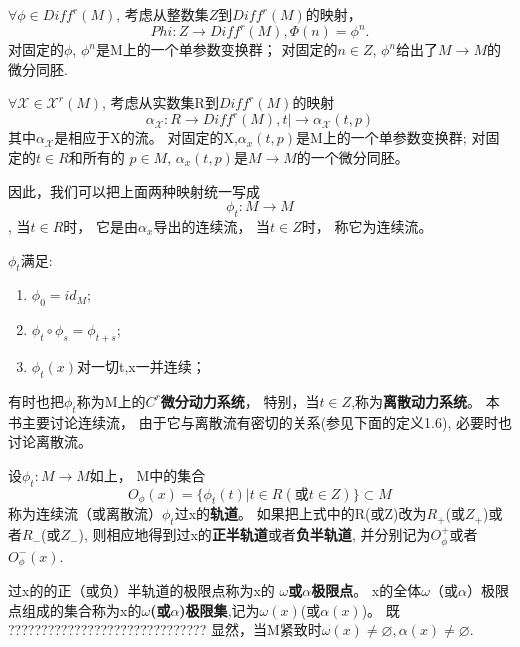 \(\forall \phi \in Diff^r(M)\),
考虑从整数集\(Z\)到\(Diff^r(M)\)的映射，
\begin{equation}
  Phi:Z \to Diff^r(M),\Phi(n)=\phi^n.
\end{equation}
对固定的\(\phi\),
\(\phi^n\)是M上的一个单参数变换群；
对固定的\(n\in Z\),
\(\phi^n\)给出了\(M \to M\)的微分同胚.


\(\forall \mathcal X\in \mathcal{X}^r(M)\),
考虑从实数集R到\(Diff^r(M)\)的映射
\begin{equation}
\alpha_{\mathcal{X}}:R\to Diff^r(M),t|\to \alpha_{\mathcal{X}}(t,p)
\end{equation}
其中\(\alpha_{\mathcal{X}}\)是相应于X的流。
对固定的X,\(\alpha_x(t,p)\)是M上的一个单参数变换群;
对固定的\(t\in R\)和所有的
\(p \in M\),
\(\alpha_x(t,p)\)是\(M \to M\)的一个微分同胚。


因此，我们可以把上面两种映射统一写成
\[\phi_t:M\to M\],
当\(t \in R\)时，
它是由\(\alpha_x\)导出的连续流，
当\(t \in Z\)时，
称它为连续流。


\(\phi_t\)满足:
\begin{enumerate}
\item\label{item:1.1.1}
  \(\phi_0=id_M\);
\item\label{item:1.1.2}
  \(\phi_t \circ \phi_s = \phi_{t+s}\);
\item\label{item:1.1.3}
  \(\phi_t(x)\)对一切t,x一并连续；
\end{enumerate}
有时也把\(\phi_t\)称为M上的\textbf{\(C^r\)微分动力系统}，
特别，当\(t \in Z\),称为\textbf{离散动力系统}。
本书主要讨论连续流，
由于它与离散流有密切的关系(参见下面的定义1.6),
必要时也讨论离散流。

\begin{defination}
  设\(\phi_t:M\to M\)如上，
  M中的集合
  \[O_\phi(x)=\{\phi_t(t)|t \in R (或t \in Z)\}\subset M\]
  称为连续流（或离散流）\(\phi_t\)过x的\textbf{轨道}。
  如果把上式中的R(或Z)改为\(R_+\)(或\(Z_+\))或者\(R_-\)(或\(Z_-\)),
  则相应地得到过x的\textbf{正半轨道}或者\textbf{负半轨道},
  并分别记为\(O_\phi^+\)或者\(O_\phi^-(x)\).
\end{defination}

\begin{defination}
  过x的的正（或负）半轨道的极限点称为x的
  \textbf{\(\omega  \)或\(\alpha\)极限点}。
  x的全体\(\omega\)（或\(\alpha\)）极限点组成的集合称为x的\textbf{\(\omega\)(或\(\alpha\))极限集},记为\(\omega(x)\)(或\(\alpha(x)\))。
  既
  ??????????????????????????????
  显然，当M紧致时\(\omega(x)\neq \varnothing,\alpha(x)\neq \varnothing\).
%



%
\end{defination}


